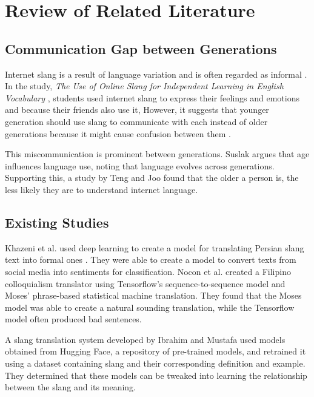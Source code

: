 \chapter{Review of Related Literature}
\label{sec:relatedlit}

\section{Communication Gap between Generations}
Internet slang is a result of language variation and is often regarded as informal \cite{Liu_Gui_Zuo_Dai_2019}.
In the study, \textit{The Use of Online Slang for Independent Learning in English Vocabulary} \cite{Ambarsari_Amrullah_Nawawi_2020}, students used internet slang to express their feelings and emotions and because their friends also use it,
However, it suggests that younger generation should use slang to communicate with each instead of older generations because it might cause confusion between them \cite{Jeresano_Carretero_2022}.

This miscommunication is prominent between generations. Suslak \cite{SUSLAK2009199} argues that age influences language use, noting that language evolves across generations.
Supporting this, a study by Teng and Joo \cite{Teng_Joo2023} found that the older a person is, the less likely they are to understand internet language.


\section{Existing Studies}
Khazeni et al. used deep learning to create a model for translating Persian slang text into formal ones \cite{Khazeni}.
They were able to create a model to convert texts from social media into sentiments for classification.
Nocon et al. \cite{Nocon_Kho_Arroyo_2018} created a Filipino colloquialism translator using Tensorflow’s sequence-to-sequence model and Moses’ phrase-based statistical machine translation.
They found that the Moses model was able to create a natural sounding translation, while the Tensorflow model often produced bad sentences.

A slang translation system developed by Ibrahim and Mustafa \cite{Abdulstar_Ibrahim_Shareef_Mustafa_2023} used models obtained from Hugging Face, a repository of pre-trained models, and retrained it using a dataset containing slang and their corresponding definition and example.
They determined that these models can be tweaked into learning the relationship between the slang and its meaning.

